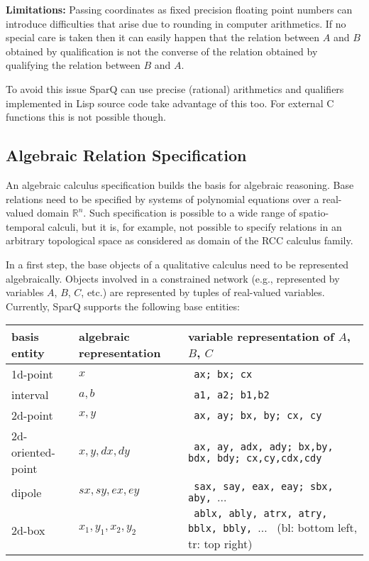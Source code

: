 \documentclass[headsepline]{scrreprt}
\theoremstyle{definition}
\newcommand{\engine}{SparQ}
\begin{document}
\medskip
{\bfseries Limitations:} Passing coordinates as fixed precision floating point numbers can introduce difficulties that arise due to rounding in computer arithmetics. If no special care is taken then it can easily happen that the relation between $A$ and $B$ obtained by qualification is not the converse of the relation obtained by qualifying the relation between $B$ and $A$.

To avoid this issue \engine{} can use precise (rational) arithmetics and qualifiers implemented in Lisp source code take advantage of this too. For external C functions this is not possible though.

\subsection{Algebraic Relation Specification}
An algebraic calculus specification builds the basis for algebraic reasoning. Base relations need to be specified by systems of polynomial equations over a real-valued domain $\mathbb{R}^n$. Such specification is possible to a wide range of spatio-temporal calculi, but it is, for example, not possible to specify relations in an arbitrary topological space as considered as domain of the RCC calculus family. 

In a first step, the base objects of a qualitative calculus need to be represented algebraically.
Objects involved in a constrained network (e.g., represented by variables $A$, $B$, $C$, etc.) are represented by tuples of real-valued variables. Currently, \engine{} supports the following base entities:

\begin{center}
\begin{tabular}{|llp{69mm}|}
\hline
basis entity & algebraic representation & variable representation of $A$, $B$, $C$\\ \hline \hline
1d-point & $x$ & \texttt{ ax;\hspace*{1em} bx;\hspace*{1em} cx}\\ 
interval & $a, b$ & \texttt{ a1, a2;\hspace*{1em} b1,b2}\\
2d-point & $x, y$ & \texttt{ ax, ay;\hspace*{1em} bx, by;\hspace*{1em} cx, cy}\\ 
2d-oriented-point & $x, y, dx, dy$ & \texttt{ ax, ay, adx, ady;\hspace*{1em} bx,by, bdx, bdy;\hspace*{1em} cx,cy,cdx,cdy}\\ 
dipole & $sx, sy, ex, ey$ & \texttt{ sax, say, eax, eay; \hspace*{1em} sbx, aby, $\ldots$ }\\
2d-box & $x_1,y_1,x_2,y_2$ & \texttt{ ablx, ably, atrx, atry, \hspace*{1em} bblx, bbly, $\ldots$ } (bl: bottom left, tr: top right)
\\
\hline
\end{tabular}
\end{center}
\end{document}
